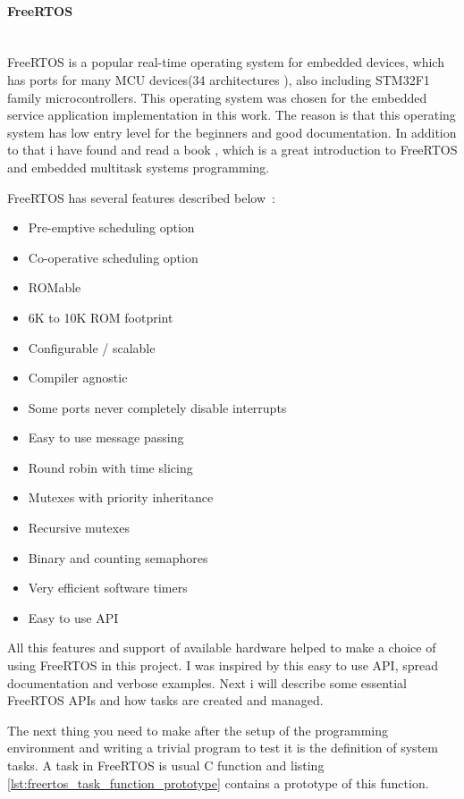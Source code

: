 \paragraph{FreeRTOS} ~\\
FreeRTOS is a popular real-time operating system for embedded devices, which has
ports for many MCU devices(34 architectures \cite{FreeRTOS_website}),
also including STM32F1 family microcontrollers.
This operating system was chosen for the embedded service application implementation in this work.
The reason is that this operating system has low entry level for the beginners and good documentation.
In addition to that i have found and read a book \cite{barry2010using}, which is a great introduction to FreeRTOS and embedded multitask systems programming. 

FreeRTOS has several features described below~\cite{FreeRTOS_website}:
\begin{itemize}
\item Pre-emptive scheduling option 
\item Co-operative scheduling option
\item ROMable
\item 6K to 10K ROM footprint
\item Configurable / scalable
\item Compiler agnostic
\item Some ports never completely disable interrupts
\item Easy to use message passing
\item Round robin with time slicing
\item Mutexes with priority inheritance
\item Recursive mutexes
\item Binary and counting semaphores
\item Very efficient software timers
\item Easy to use API 
\end{itemize}

All this features and support of available hardware helped to make a choice of using FreeRTOS in this project.
I was inspired by this easy to use API, spread documentation and verbose examples.
Next i will describe some essential FreeRTOS APIs  and how tasks are created and managed.

The next thing you need to make after the setup of the programming environment and writing a trivial program to test it is the definition of system tasks.
A task in FreeRTOS is usual C function and
listing \ref{lst:freertos_task_function_prototype} contains a prototype of this
function.


